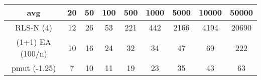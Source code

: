 \begin{tabular}[h]{ccccccccc}
avg&20&50&100&500&1000&5000&10000&50000\\\hline
RLS-N (4)&12&26&53&221&442&2166&4194&20690\\
(1+1) EA (100/n)&10&16&24&32&34&47&69&222\\
pmut (-1.25)&7&10&11&19&23&35&43&63\\
\end{tabular}
